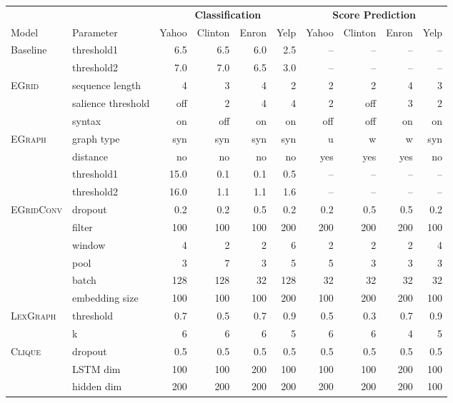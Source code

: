 \documentclass[11pt,a4paper]{article}
\newcommand \egrid{\textsc{EGrid}\xspace}
\newcommand \egraph{\textsc{EGraph}\xspace}
\newcommand \lexgraph{\textsc{LexGraph}\xspace}
\newcommand \clique{\textsc{Clique}\xspace}
\newcommand \egridconv{\textsc{EGridConv}\xspace}
\begin{document}
\begin{table*}
\begin{center}
\begin{footnotesize}
\begin{tabular}{llrrrrrrrr}
\toprule
 & & \multicolumn{4}{c}{\textbf{Classification}} & \multicolumn{4}{c}{\textbf{Score Prediction}} \\
Model & Parameter & Yahoo & Clinton & Enron & Yelp & Yahoo & Clinton & Enron & Yelp \\
\midrule
Baseline & threshold1 & 6.5 & 6.5 & 6.0 & 2.5 & -- & -- & -- & --  \\
			& threshold2 & 7.0 & 7.0 & 6.5 & 3.0 & -- & -- & -- & -- \\
\midrule
\egrid	& sequence length & 4 & 3 & 4 & 2 & 2 & 2 & 4 & 3 \\
		& salience threshold & off & 2 & 4 & 4 & 2 & off & 3 & 2 \\
        & syntax & on & off & on & on & off & off & on & on \\
        \midrule
\egraph 	& graph type & syn & syn & syn & syn & u & w & w & syn \\
		& distance & no & no & no & no & yes & yes & yes & no \\
        & threshold1 & 15.0 & 0.1 & 0.1 & 0.5 & -- & -- & -- & -- \\
        & threshold2 & 16.0 & 1.1 & 1.1 & 1.6 & -- & -- & -- & -- \\
        \midrule
\egridconv 	& dropout & 0.2 & 0.2 & 0.5 & 0.2  & 0.2 & 0.5 & 0.5 & 0.2 \\
			& filter & 100 & 100 & 100 & 200 & 200 & 200 & 200 & 100 \\
            & window & 4 & 2 & 2 & 6 & 2 & 2 & 2 & 4  \\
            & pool & 3 & 7 & 3 & 5 & 5 & 3 & 3 & 3 \\
            & batch & 128 & 128 & 32 & 128 & 32 & 32 & 32 & 32 \\
            & embedding size & 100 & 100 & 100 & 200 & 100 & 200 & 200 & 100 \\
            \midrule
\lexgraph	& threshold & 0.7 & 0.5 & 0.7 & 0.9 & 0.5 & 0.3 & 0.7 & 0.9  \\
	& k & 6 & 6 & 6 & 5 & 6 & 6 & 4 & 5 \\
    \midrule
\clique	& dropout & 0.5 & 0.5 & 0.5 & 0.5 & 0.5 & 0.5 & 0.5 & 0.5 \\
		& LSTM dim & 100 & 100 & 200 & 100 & 100 & 100 & 200 & 100 \\
        & hidden dim & 200 & 200 & 200 & 200 & 200 & 200 & 200 & 100  \\

\end{tabular}
\end{footnotesize}
\end{center}
\end{table*}
\end{document}
